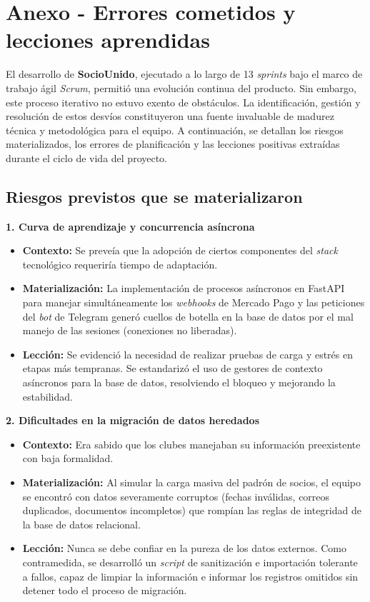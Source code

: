 \section{Anexo - Errores cometidos y lecciones aprendidas}

El desarrollo de \textbf{SocioUnido}, ejecutado a lo largo de 13 \textit{sprints} bajo el marco de trabajo ágil \textit{Scrum}, permitió una evolución continua del producto. Sin embargo, este proceso iterativo no estuvo exento de obstáculos. La identificación, gestión y resolución de estos desvíos constituyeron una fuente invaluable de madurez técnica y metodológica para el equipo. A continuación, se detallan los riesgos materializados, los errores de planificación y las lecciones positivas extraídas durante el ciclo de vida del proyecto.

\subsection{Riesgos previstos que se materializaron}

\textbf{1. Curva de aprendizaje y concurrencia asíncrona}
\begin{itemize}
    \item \textbf{Contexto:} Se preveía que la adopción de ciertos componentes del \textit{stack} tecnológico requeriría tiempo de adaptación.
    \item \textbf{Materialización:} La implementación de procesos asíncronos en FastAPI para manejar simultáneamente los \textit{webhooks} de Mercado Pago y las peticiones del \textit{bot} de Telegram generó cuellos de botella en la base de datos por el mal manejo de las sesiones (conexiones no liberadas).
    \item \textbf{Lección:} Se evidenció la necesidad de realizar pruebas de carga y estrés en etapas más tempranas. Se estandarizó el uso de gestores de contexto asíncronos para la base de datos, resolviendo el bloqueo y mejorando la estabilidad.
\end{itemize}

\textbf{2. Dificultades en la migración de datos heredados}
\begin{itemize}
    \item \textbf{Contexto:} Era sabido que los clubes manejaban su información preexistente con baja formalidad.
    \item \textbf{Materialización:} Al simular la carga masiva del padrón de socios, el equipo se encontró con datos severamente corruptos (fechas inválidas, correos duplicados, documentos incompletos) que rompían las reglas de integridad de la base de datos relacional.
    \item \textbf{Lección:} Nunca se debe confiar en la pureza de los datos externos. Como contramedida, se desarrolló un \textit{script} de sanitización e importación tolerante a fallos, capaz de limpiar la información e informar los registros omitidos sin detener todo el proceso de migración.
\end{itemize}

